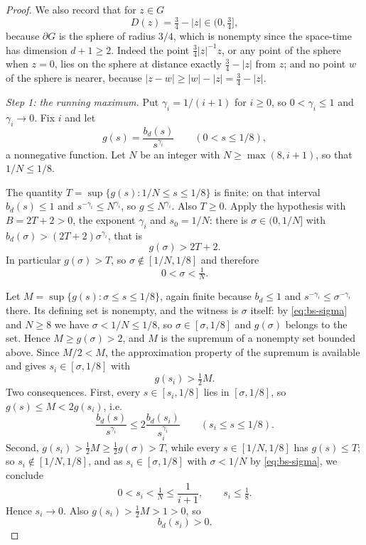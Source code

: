 \begin{proof}
We also record that for $z\in G$
\begin{equation}\label{eq:bs-D}
  D(z)=\tfrac34-|z|\in(0,\tfrac34],
\end{equation}
because $\partial G$ is the sphere of radius $3/4$, which is nonempty since the
space-time has dimension $d+1\ge2$. Indeed the point $\tfrac34|z|^{-1}z$, or any
point of the sphere when $z=0$, lies on the sphere at distance exactly
$\tfrac34-|z|$ from $z$; and no point $w$ of the sphere is nearer, because
$|z-w|\ge|w|-|z|=\tfrac34-|z|$.

\emph{Step 1: the running maximum.}
Put $\gamma_i=1/(i+1)$ for $i\ge0$, so $0<\gamma_i\le1$ and $\gamma_i\to0$. Fix
$i$ and let
\[
  g(s)=\frac{b_d(s)}{s^{\gamma_i}}\qquad(0<s\le1/8),
\]
a nonnegative function. Let $N$ be an integer with $N\ge\max(8,i+1)$, so that
$1/N\le1/8$.

The quantity $T=\sup\{g(s):1/N\le s\le1/8\}$ is finite: on that interval
$b_d(s)\le1$ and $s^{-\gamma_i}\le N^{\gamma_i}$, so $g\le N^{\gamma_i}$. Also
$T\ge0$. Apply the hypothesis with $B=2T+2>0$, the exponent $\gamma_i$ and
$s_0=1/N$: there is $\sigma\in(0,1/N]$ with $b_d(\sigma)>(2T+2)\sigma^{\gamma_i}$,
that is
\[
  g(\sigma)>2T+2 .
\]
In particular $g(\sigma)>T$, so $\sigma\notin[1/N,1/8]$ and therefore
\begin{equation}\label{eq:bs-sigma}
  0<\sigma<\tfrac1N .
\end{equation}

Let $M=\sup\{g(s):\sigma\le s\le1/8\}$, again finite because $b_d\le1$ and
$s^{-\gamma_i}\le\sigma^{-\gamma_i}$ there. Its defining set is nonempty, and
the witness is $\sigma$ itself: by \eqref{eq:bs-sigma} and $N\ge8$ we have
$\sigma<1/N\le1/8$, so $\sigma\in[\sigma,1/8]$ and $g(\sigma)$ belongs to the
set. Hence $M\ge g(\sigma)>2$, and $M$ is the supremum of a nonempty set bounded
above. Since $M/2<M$, the approximation property of the supremum is available
and gives $s_i\in[\sigma,1/8]$ with
\begin{equation}\label{eq:bs-approxmax}
  g(s_i)>\tfrac12M .
\end{equation}
Two consequences. First, every $s\in[s_i,1/8]$ lies in $[\sigma,1/8]$, so
$g(s)\le M<2g(s_i)$, i.e.
\begin{equation}\label{eq:bs-running}
  \frac{b_d(s)}{s^{\gamma_i}}\le2\frac{b_d(s_i)}{s_i^{\gamma_i}}
  \qquad(s_i\le s\le1/8).
\end{equation}
Second, $g(s_i)>\tfrac12M\ge\tfrac12g(\sigma)>T$, while every $s\in[1/N,1/8]$
has $g(s)\le T$; so $s_i\notin[1/N,1/8]$, and as $s_i\in[\sigma,1/8]$ with
$\sigma<1/N$ by \eqref{eq:bs-sigma}, we conclude
\begin{equation}\label{eq:bs-si}
  0<s_i<\tfrac1N\le\frac1{i+1},\qquad s_i\le\tfrac18 .
\end{equation}
Hence $s_i\to0$. Also $g(s_i)>\tfrac12M>1>0$, so
\begin{equation}\label{eq:bs-bpos}
  b_d(s_i)>0 .
\end{equation}


\end{proof}
